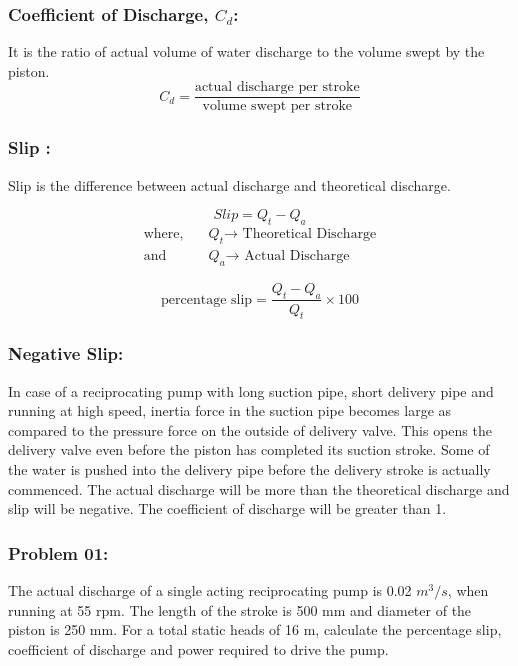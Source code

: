\documentclass{article}
\begin{document}
\subsubsection*{Coefficient of Discharge, $C_d$:}
It is the ratio of actual volume of water discharge to the volume swept by the piston. \\

\[ C_d = \frac{{\text{{actual discharge per stroke}}}}{{\text{{volume swept per stroke}}}} \]

\subsubsection*{Slip :}
Slip is the difference between actual discharge and theoretical discharge. 

\[ Slip = Q_t - Q_a\]
\begin{align*}
  \text{where,} \quad &Q_t \text{→ Theoretical Discharge} \\
  \text{and} \quad &Q_a  \text{→ Actual Discharge}
\end{align*}

\[ {\text{percentage slip}} = \frac{Q_t - Q_a}{Q_t} \times 100 \] 


\subsubsection*{Negative Slip:}
In case of a reciprocating pump with long suction pipe, short delivery pipe and running at high speed, inertia force in the suction pipe becomes large as compared to the pressure force on the outside of delivery valve. This opens the delivery valve even before the piston has completed its suction stroke. Some of the water is pushed into the delivery pipe before the delivery stroke is actually commenced. The actual discharge will be more than the theoretical discharge and slip will be negative. The coefficient of discharge will be greater than 1. 

\subsubsection*{Problem 01:}
The actual discharge of a single acting reciprocating pump is 0.02 $m^3/s$, when running at 55 rpm. The length of the stroke is 500 mm and diameter of the piston is 250 mm. For a total static heads of 16 m, calculate the percentage slip, coefficient of discharge and power required to drive the pump.\\ 
\end{document}
